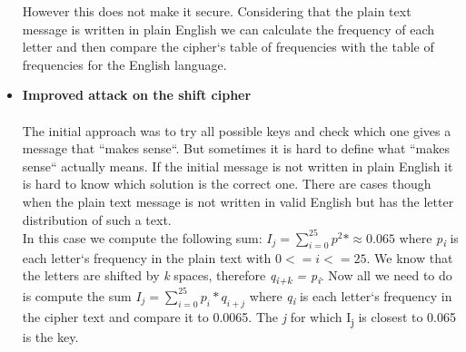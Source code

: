 \begin{itemize}
However this does not make it secure. Considering that the plain text message is written
in plain English we can calculate the frequency of each letter and then compare the cipher`s table of frequencies with the table of frequencies for the English language.
    \item \textbf{Improved attack on the shift cipher}\\\\
The initial approach was to try all possible keys and check which one gives a message that
``makes sense``. But sometimes it is hard to define what ``makes sense`` actually means. If the
initial message is not written in plain English it is hard to know which solution is the correct one.
There are cases though when the plain text message is not written in valid English but has the
letter distribution of such a text.\\
In this case we compute the following sum: \begin{math}I_j = \sum_{i=0}^{25} p^2*\approx0.065\end{math} where \textit{p\textsubscript{i}} is each letter`s frequency in the plain text with \begin{math}0<=i<=25\end{math}. We know that the letters are shifted by \textit{k} spaces, therefore \textit{q\textsubscript{i+k} = p\textsubscript{i}}. Now all we need to do is compute the sum \begin{math}I_j = \sum_{i=0}^{25} p_i*q_{i+j}\end{math} where \textit{q\textsubscript{i}} is each letter`s frequency in the cipher text and compare it to 0.0065. The \textit{j} for which I\textsubscript{j} is closest to 0.065 is the key. 


\end{itemize}
